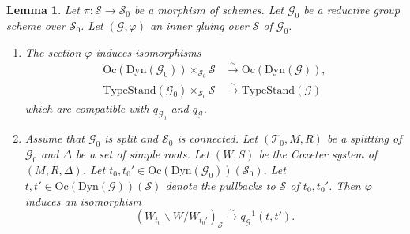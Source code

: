 \documentclass[12pt,a4paper]{article}
\newtheorem{lem}[thm]{Lemma}
\newcommand{\sG}{\mathscr{G}}
\newcommand{\sS}{\mathscr{S}}
\newcommand{\sT}{\mathscr{T}}
\begin{document}
\begin{lem}\label{lem:igiso}
Let $\pi \colon \sS \to \sS_0$ be a morphism of schemes. 
Let $\sG_0$ be a reductive group scheme over $\sS_0$. 
Let $(\sG , \varphi)$ 
an inner gluing over $\sS$ of $\sG_0$. 
\begin{enumerate}
\item\label{en:Dyphi}
The section $\varphi$ induces isomorphisms 
\begin{align*}
 \mathrm{Oc}(\mathrm{Dyn}(\sG_0)) \times_{\sS_0} \sS &\xrightarrow{\sim}  \mathrm{Oc}(\mathrm{Dyn}(\sG)), \\ 
 \mathrm{TypeStand}(\sG_0) \times_{\sS_0} \sS &\xrightarrow{\sim}  \mathrm{TypeStand}(\sG) 
\end{align*}
which are compatible with $q_{\sG_0}$ and $q_{\sG}$. 
\item\label{en:Wphi}
Assume that $\sG_0$ is split and $\sS_0$ is connected. 
Let $(\sT_0,M,R)$ be a splitting of $\sG_0$ 
and $\Delta$ be a set of simple roots. 
Let $(W,S)$ be the Coxeter system of $(M,R,\Delta)$. 
Let $t_0,t_0' \in \mathrm{Oc}(\mathrm{Dyn}(\sG_0))(\sS_0)$. 
Let $t,t' \in \mathrm{Oc}(\mathrm{Dyn}(\sG))(\sS)$ 
denote the pullbacks to $\sS$ of $t_0,t_0'$. 
Then $\varphi$ induces an isomorphism 
\[
 (W_{t_0} \backslash W /W_{t_0'})_{\sS} \xrightarrow{\sim} 
 q_{\sG}^{-1}(t,t'). 
\]
\end{enumerate}
\end{lem}
\end{document}
